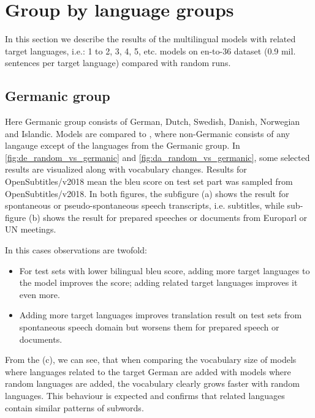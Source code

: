 \chapter{Group by language groups}
\label{section:experiment_groups}


In this section we describe the results of the multilingual models with related target languages, i.e.: 1 to 2, 3, 4, 5, etc. models on en-to-36 dataset (0.9 mil. sentences per target language)
compared with random runs.


\section{Germanic group}
\label{section:germanic_group}

Here Germanic group consists of German, Dutch, Swedish, Danish, Norwegian and Islandic.
Models  are compared to , where non-Germanic consists
of any langauge except of the languages from the Germanic group.
In \cref{fig:de_random_vs_germanic} and \cref{fig:da_random_vs_germanic}, some selected
results are visualized along with vocabulary changes. Results for OpenSubtitles/v2018 mean
the \acrshort{bleu} score on test set part was sampled from OpenSubtitles/v2018.
In both figures, the subfigure (a) shows the result for spontaneous or pseudo-spontaneous speech
transcripts, i.e. subtitles, while sub-figure (b) shows the result for prepared
speeches or documents from Europarl or UN meetings.

In this cases observations are twofold:
\begin{itemize}
	\item For test sets with lower bilingual \acrshort{bleu} score,
		adding more target languages to the model improves the score;
		adding related target languages improves it even more.
	\item Adding more target languages improves translation result on test
		sets from spontaneous speech domain
		but worsens them for prepared speech or documents.
\end{itemize}

From the (c), we can see, that when comparing the vocabulary size of models
where languages related to the
target German are added with models where random languages are added,
the vocabulary clearly grows faster with random languages.
This behaviour is expected and confirms that related languages contain
similar patterns of subwords.

